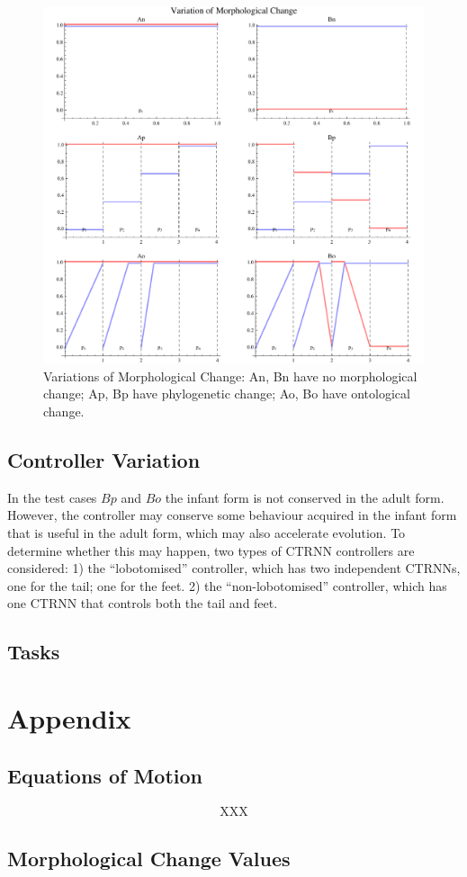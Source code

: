 \begin{figure}
  \begin{center} 
    \includegraphics[scale=0.7]{fig/morph-regiment.pdf} 
  \end{center} 
  \caption{Variations of Morphological Change: An, Bn have no
    morphological change; Ap, Bp have phylogenetic change; Ao, Bo have
    ontological change.} 
  \label{morph-regiment}
\end{figure}

\subsection{Controller Variation}

In the test cases $Bp$ and $Bo$ the infant form is not conserved in
the adult form.  However, the controller may conserve some behaviour
acquired in the infant form that is useful in the adult form, which
may also accelerate evolution.  To determine whether this may happen,
two types of CTRNN controllers are considered: 1) the ``lobotomised''
controller, which has two independent CTRNNs, one for the tail; one
for the feet. 2) the ``non-lobotomised'' controller, which has one
CTRNN that controls both the tail and feet.  

\subsection{Tasks}




\section{Appendix}

\subsection{Equations of Motion} \label{physeqs-sec}

\begin{eqnarray}
  \text{XXX} \label{physeqs}
\end{eqnarray}
%

\subsection{Morphological Change Values} \label{morph-regiment-values}
